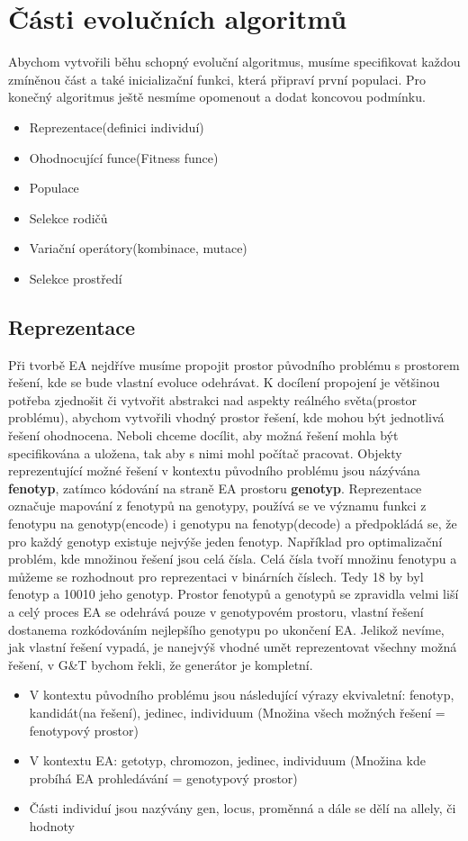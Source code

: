 \section{Části evolučních algoritmů}
Abychom vytvořili běhu schopný evoluční algoritmus, musíme specifikovat každou zmíněnou část a také inicializační funkci, která připraví první populaci. Pro konečný algoritmus ještě nesmíme opomenout a dodat koncovou podmínku. 
\begin{itemize}
\item{Reprezentace(definici individuí)}
\item{Ohodnocující funce(Fitness funce)}
\item{Populace}
\item{Selekce rodičů}
\item{Variační operátory(kombinace, mutace)}
\item{Selekce prostředí}
\end{itemize}
\subsection{Reprezentace}
Při tvorbě EA nejdříve musíme propojit prostor původního problému s prostorem řešení, kde se bude vlastní evoluce odehrávat. K docílení propojení je většinou potřeba zjednošit či vytvořit abstrakci nad aspekty reálného světa(prostor problému), abychom vytvořili vhodný prostor řešení, kde mohou být jednotlivá řešení ohodnocena. Neboli chceme docílit, aby možná řešení mohla být specifikována a uložena, tak aby s nimi mohl počítač pracovat. Objekty reprezentující možné řešení v kontextu původního problému jsou názývána \textbf{fenotyp}, zatímco kódování na straně EA prostoru \textbf{genotyp}. Reprezentace označuje mapování z fenotypů na genotypy, používá se ve významu funkci z fenotypu na genotyp(encode) i genotypu na fenotyp(decode) a předpokládá se, že pro každý genotyp existuje nejvýše jeden fenotyp. Například pro optimalizační problém, kde množinou řešení jsou celá čísla. Celá čísla tvoří množinu fenotypu a můžeme se rozhodnout pro reprezentaci v binárních číslech. Tedy 18 by byl fenotyp a 10010 jeho genotyp. Prostor fenotypů a genotypů se zpravidla velmi liší a celý proces EA se odehrává pouze v genotypovém prostoru, vlastní řešení dostanema rozkódováním nejlepšího genotypu po ukončení EA. Jelikož nevíme, jak vlastní řešení vypadá, je nanejvýš vhodné umět reprezentovat všechny možná řešení, v G\&T bychom řekli, že generátor je kompletní.
\begin{itemize}
\item V kontextu původního problému jsou následující výrazy ekvivaletní: fenotyp, kandidát(na řešení), jedinec, individuum (Množina všech možných řešení = fenotypový prostor)
\item V kontextu EA: getotyp, chromozon, jedinec, individuum (Množina kde probíhá EA prohledávání = genotypový prostor)
\item Části individuí jsou nazývány gen, locus, proměnná a dále se dělí na allely, či hodnoty
\end{itemize}
